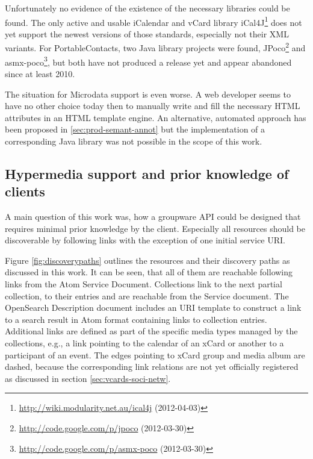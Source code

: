\documentclass[11pt,a4paper,headsepline,twoside]{scrartcl}		%
\newcommand{\citeurl}[2]{\url{#1} (#2)}
\begin{document}
Unfortunately no evidence of the existence of the necessary libraries could be
found. The only active and usable iCalendar and vCard library
iCal4J\footnote{\citeurl{http://wiki.modularity.net.au/ical4j}{2012-04-03}} does
not yet support the newest versions of those standards, especially not their XML
variants. For PortableContacts, two Java library projects were found,
JPoco\footnote{\citeurl{http://code.google.com/p/jpoco}{2012-03-30}} and
asmx-poco\footnote{\citeurl{http://code.google.com/p/asmx-poco}{2012-03-30}},
but both have not produced a release yet and appear abandoned since at least
2010.

The situation for Microdata support is even worse. A web developer seems to have
no other choice today then to manually write and fill the necessary HTML
attributes in an HTML template engine. An alternative, automated approach has
been proposed in \autoref{sec:prod-semant-annot} but the implementation of a
corresponding Java library was not possible in the scope of this work.

\subsection{Hypermedia support and prior knowledge of clients}
\label{sec:hyperm-supp-disc}

A main question of this work was, how a groupware API could be designed that
requires minimal prior knowledge by the client. Especially all resources should
be discoverable by following links with the exception of one initial service
URI.

Figure \ref{fig:discoverypaths} outlines the resources and their discovery paths
as discussed in this work. It can be seen, that all of them are reachable
following links from the Atom Service Document. Collections link to the next
partial collection, to their entries and are reachable from the Service
document. The OpenSearch Description document includes an URI template to
construct a link to a search result in Atom format containing links to
collection entries. Additional links are defined as part of the specific media
types managed by the collections, e.g., a link pointing to the calendar of an
xCard or another to a participant of an event. The edges pointing to xCard group
and media album are dashed, because the corresponding link relations are not yet
officially registered as discussed in section \ref{sec:vcards-soci-netw}.
\end{document}
